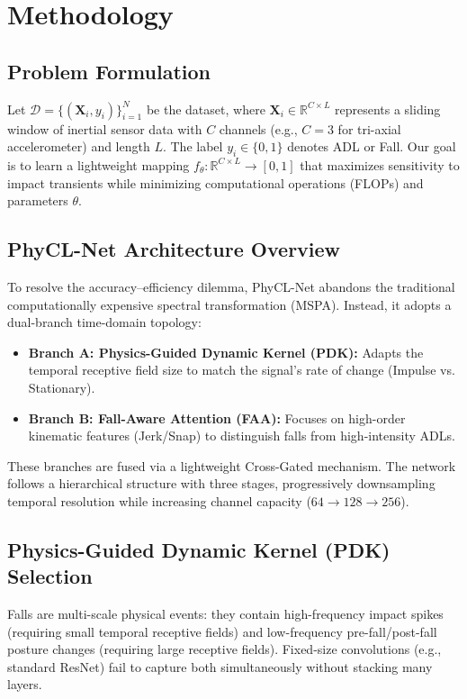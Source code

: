\documentclass{article}
\begin{document}
\section{Methodology}

\subsection{Problem Formulation}

Let $\mathcal{D} = \{(\mathbf{X}_i, y_i)\}_{i=1}^N$ be the dataset, where $\mathbf{X}_i \in \mathbb{R}^{C \times L}$ represents a sliding window of inertial sensor data with $C$ channels (e.g., $C=3$ for tri-axial accelerometer) and length $L$. The label $y_i \in \{0, 1\}$ denotes ADL or Fall. Our goal is to learn a lightweight mapping $f_\theta: \mathbb{R}^{C \times L} \to [0,1]$ that maximizes sensitivity to impact transients while minimizing computational operations (FLOPs) and parameters $\theta$.

\subsection{PhyCL-Net Architecture Overview}

To resolve the accuracy--efficiency dilemma, PhyCL-Net abandons the traditional computationally expensive spectral transformation (MSPA). Instead, it adopts a dual-branch time-domain topology:
\begin{itemize}
\item \textbf{Branch A: Physics-Guided Dynamic Kernel (PDK):} Adapts the temporal receptive field size to match the signal's rate of change (Impulse vs. Stationary).
\item \textbf{Branch B: Fall-Aware Attention (FAA):} Focuses on high-order kinematic features (Jerk/Snap) to distinguish falls from high-intensity ADLs.
\end{itemize}
These branches are fused via a lightweight Cross-Gated mechanism. The network follows a hierarchical structure with three stages, progressively downsampling temporal resolution while increasing channel capacity ($64 \to 128 \to 256$).

\subsection{Physics-Guided Dynamic Kernel (PDK) Selection}

Falls are multi-scale physical events: they contain high-frequency impact spikes (requiring small temporal receptive fields) and low-frequency pre-fall/post-fall posture changes (requiring large receptive fields). Fixed-size convolutions (e.g., standard ResNet) fail to capture both simultaneously without stacking many layers.
\end{document}
